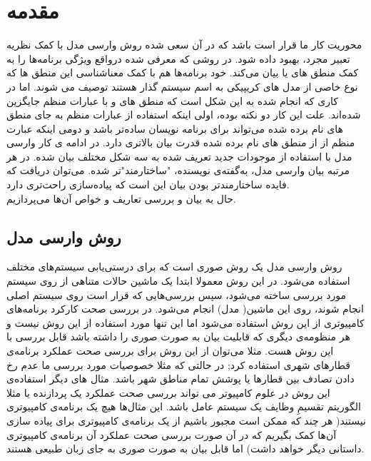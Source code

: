 \pagestyle{plain}
\setcounter{page}{1}

\chapter{مقدمه}


محوریت کار ما قرار است\cite{calcul} باشد که در آن سعی شده روش وارسی مدل با کمک نظریه تعبیر مجرد، بهبود داده شود. در\cite{clarke} روشی که معرفی شده در‌واقع ویژگی برنامه‌ها را به کمک منطق های  یا  بیان می‌کند. خود برنامه‌ها هم با کمک معناشناسی این منطق ها که نوع خاصی از مدل های کریپیکی به اسم سیستم گذار هستند توصیف می شوند. اما در\cite{calcul} کاری که انجام شده به این شکل است که منطق های  و  با عبارات منظم\cite{kleene56} جایگزین شده‌اند. علت این کار دو نکته بوده، اولی اینکه استفاده از عبارات منظم به جای منطق های نام برده شده می‌تواند برای برنامه نویسان ساده‌تر باشد و دومی اینکه عبارت منظم از از منطق های نام برده شده قدرت بیان بالاتری دارد.\cite{regisbetter} در ادامه ی کار وارسی مدل با استفاده از موجودات جدید تعریف شده به سه شکل مختلف بیان شده. در هر مرتبه بیان وارسی مدل، به‌گفته‌ی نویسنده، "ساختارمند"تر شده. می‌توان دریافت که فایده ساختارمندتر بودن بیان این است که پیاده‌سازی راحت‌تری دارد.\\
حال به بیان و بررسی تعاریف و خواص آن‌ها می‌پردازیم.


\section{روش وارسی مدل}

روش وارسی مدل یک روش صوری است که برای درستی‌یابی سیستم‌های مختلف استفاده می‌شود. در این روش معمولا ابتدا یک ماشین حالات متناهی از روی سیستم مورد بررسی ساخته می‌شود، سپس بررسی‌هایی که قرار است روی سیستم اصلی انجام شوند، روی این ماشین( مدل) انجام می‌شود. در بررسی صحت کارکرد برنامه‌های کامپیوتری از این روش استفاده می‌شود اما این تنها مورد استفاده از این روش نیست و هر منظومه‌ی دیگری که قابلیت بیان به صورت صوری را داشته باشد قابل بررسی با این روش هست. مثلا می‌توان از این روش برای بررسی صحت عملکرد برنامه‌ی قطارهای شهری استفاده کرد; در حالتی که مثلا خصوصیات مورد بررسی ما عدم رخ دادن تصادف بین قطارها یا پوشش تمام  مناطق شهر باشد. مثال های دیگر استفاده‌ی این روش در علوم کامپیوتر می تواند بررسی صحت عملکرد یک پردازنده یا مثلا الگوریتم تقسیمِ وظایف یک سیستم عامل باشد. این مثال‌ها هیچ یک برنامه‌ی کامپیوتری نیستند( هر چند که ممکن است مجبور باشیم از یک برنامه‌ی کامپیوتری برای پیاده سازی آن‌ها کمک بگیریم که در آن صورت بررسی صحت عملکرد آن برنامه‌ی کامپیوتری داستانی دیگر خواهد داشت) اما قابل بیان به صورت صوری به جای زبان طبیعی هستند.

